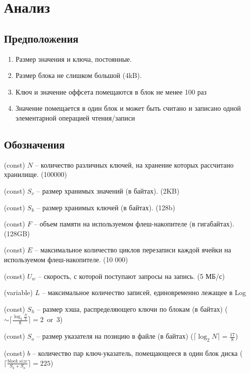 \section*{Анализ}
	\subsection*{Предположения}
	\begin{enumerate}
		\item Размер значения и ключа, постоянные.
		
		\item Размер блока не слишком большой (4kB).
		
		\item Ключ и значение оффсета помещаются в блок не менее 100 раз
		
		\item Значение помещается в один блок и может быть считано и записано одной элементарной операцией чтения/записи
		
	\end{enumerate}

	\subsection*{Обозначения}
	
	(const) $N$ -- количество различных ключей, на хранение которых рассчитано хранилище. (100000)
	
	(const) $S_v$ -- размер хранимых значений (в байтах). (2KB)
	
	(const) $S_k$ -- размер хранимых ключей (в байтах). (128b)
	
	(const) $F$ -- объем памяти на используемом флеш-накопителе (в гигабайтах). (128GB)
	
	(const) $E$ -- максимальное количество циклов перезаписи каждой ячейки на используемом флеш-накопителе. (10 000)
	
	(const) $U_w$ -- скорость, с которой поступают запросы на запись. (5 МБ/с)
	
	(variable) $L$ -- максимальное количество записей, единовременно лежащее в Log
	
	(const) $S_h$ -- размер хэша, распределяющего ключи по блокам (в байтах) ($\sim\lceil\frac{\log_2 \frac{N}{b}}{8}\rceil = 2\ \operatorname{or}\ 3$)
	
	(const) $S_o$ -- размер указателя на позицию в файле (в байтах) ($ \lceil\log_2N\rceil = \frac{17}{8}$)
	
	(const) $b$ -- количество пар ключ-указатель, помещающееся в один блок диска ($\lceil\frac{block\ size}{S_k + S_o}\rceil = 225$)
	
